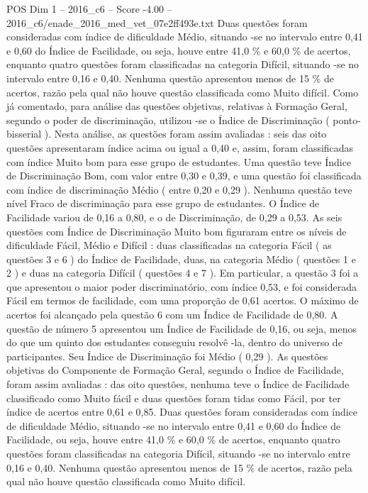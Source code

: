 \begin{textsample}{POS Dim 1 – 2016\_c6 – Score -4.00 – 2016\_c6/enade\_2016\_med\_vet\_07e2ff493e.txt}
Duas questões foram consideradas com índice de dificuldade Médio, situando -se no intervalo entre 0,41 e 0,60 do Índice de Facilidade, ou seja, houve entre 41,0 \% e 60,0 \% de acertos, enquanto quatro questões foram classificadas na categoria Difícil, situando -se no intervalo entre 0,16 e 0,40.
Nenhuma questão apresentou menos de 15 \% de acertos, razão pela qual não houve questão classificada como Muito difícil.
Como já comentado, para análise das questões objetivas, relativas à Formação Geral, segundo o poder de discriminação, utilizou -se o Índice de Discriminação ( ponto-bisserial ).
Nesta análise, as questões foram assim avaliadas : seis das oito questões apresentaram índice acima ou igual a 0,40 e, assim, foram classificadas com índice Muito bom para esse grupo de estudantes.
Uma questão teve Índice de Discriminação Bom, com valor entre 0,30 e 0,39, e uma questão foi classificada com índice de discriminação Médio ( entre 0,20 e 0,29 ).
Nenhuma questão teve nível Fraco de discriminação para esse grupo de estudantes.
O Índice de Facilidade variou de 0,16 a 0,80, e o de Discriminação, de 0,29 a 0,53.
As seis questões com Índice de Discriminação Muito bom figuraram entre os níveis de dificuldade Fácil, Médio e Difícil : duas classificadas na categoria Fácil ( as questões 3 e 6 ) do Índice de Facilidade, duas, na categoria Médio ( questões 1 e 2 ) e duas na categoria Difícil ( questões 4 e 7 ).
Em particular, a questão 3 foi a que apresentou o maior poder discriminatório, com índice 0,53, e foi considerada Fácil em termos de facilidade, com uma proporção de 0,61 acertos.
O máximo de acertos foi alcançado pela questão 6 com um Índice de Facilidade de 0,80.
A questão de número 5 apresentou um Índice de Facilidade de 0,16, ou seja, menos do que um quinto dos estudantes conseguiu resolvê -la, dentro do universo de participantes.
Seu Índice de Discriminação foi Médio ( 0,29 ).
As questões objetivas do Componente de Formação Geral, segundo o Índice de Facilidade, foram assim avaliadas : das oito questões, nenhuma teve o Índice de Facilidade classificado como Muito fácil e duas questões foram tidas como Fácil, por ter índice de acertos entre 0,61 e 0,85.
Duas questões foram consideradas com índice de dificuldade Médio, situando -se no intervalo entre 0,41 e 0,60 do Índice de Facilidade, ou seja, houve entre 41,0 \% e 60,0 \% de acertos, enquanto quatro questões foram classificadas na categoria Difícil, situando -se no intervalo entre 0,16 e 0,40.
Nenhuma questão apresentou menos de 15 \% de acertos, razão pela qual não houve questão classificada como Muito difícil.

\end{textsample}
